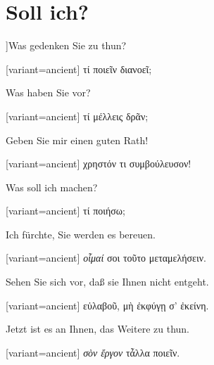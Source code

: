 \section{Soll ich?}

]Was gedenken Sie zu thun? 

\switchcolumn

\begin{greek}[variant=ancient]%
τί ποιεῖν διανοεῖ;

\end{greek}%
\switchcolumn*

Was haben Sie vor? 

\switchcolumn

\begin{greek}[variant=ancient]%
τί μέλλεις δρᾶν;

\end{greek}%
\switchcolumn*

Geben Sie mir einen guten Rath! 

\switchcolumn

\begin{greek}[variant=ancient]%
χρηστόν τι συμβούλευσον!

\end{greek}%
\switchcolumn*

Was soll ich machen? 

\switchcolumn

\begin{greek}[variant=ancient]%
τί ποιήσω;

\end{greek}%
\switchcolumn*

Ich fürchte, Sie werden es bereuen. 

\switchcolumn

\begin{greek}[variant=ancient]%
\emph{οἶμαί} σοι τοῦτο μεταμελήσειν.

\end{greek}%
\switchcolumn*

Sehen Sie sich vor, daß sie Ihnen nicht entgeht. 

\switchcolumn

\begin{greek}[variant=ancient]%
εὐλαβοῦ, μὴ ἐκφύγῃ σ' ἐκείνη.

\end{greek}%
\switchcolumn*

Jetzt ist es an Ihnen, das Weitere zu thun. 

\switchcolumn

\begin{greek}[variant=ancient]%
\emph{σὸν ἔργον} τἆλλα ποιεῖν.

\end{greek}%
\switchcolumn*

